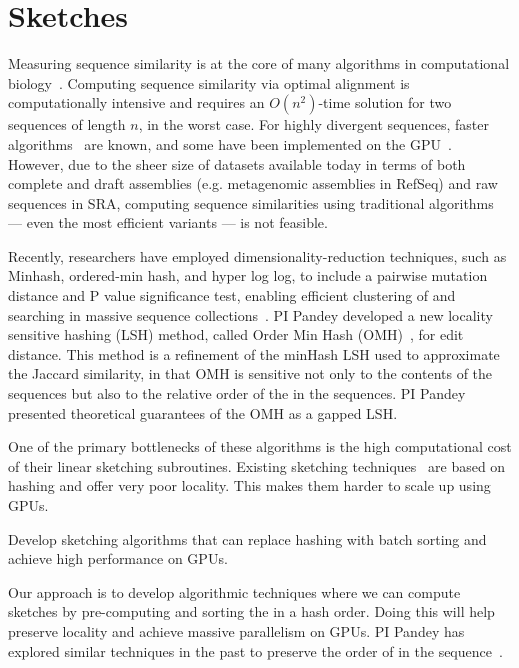 \section{Sketches}

Measuring sequence similarity is at the core of many algorithms in computational biology~\cite{Myers2000, Langmead2012,Li2010}. Computing sequence similarity via optimal alignment is computationally intensive and requires an $O(n^2)$-time solution for two sequences of length $n$, in the worst case.  For highly divergent sequences, faster algorithms~\cite{MarcoSola2023} are known, and some have been implemented on the GPU~\cite{AguadoPuig2023}. However, due to the sheer size of datasets available today in terms of both complete and draft assemblies (e.g. metagenomic assemblies in RefSeq) and raw sequences in SRA, computing sequence similarities using traditional algorithms --- even the most efficient variants --- is not feasible.

Recently, researchers have employed dimensionality-reduction techniques, such as Minhash, ordered-min hash, and hyper log log, to include a pairwise mutation distance and P value significance test, enabling  efficient clustering of and searching in massive sequence collections~\cite{Mitzenmacher2014,ondov2016mash,Marais2019,Baker2019}. PI Pandey developed a new locality sensitive hashing (LSH) method, called Order Min Hash (OMH)~\cite{Marais2019}, for  edit distance. This method is a refinement of the minHash LSH used to approximate the Jaccard similarity, in that OMH is sensitive not only to the \kmer contents of the sequences but also to the relative order of the \kmers in the sequences. PI Pandey presented theoretical guarantees of the OMH as a gapped LSH\@.

One of the primary bottlenecks of these algorithms is the high computational cost of their linear sketching subroutines. Existing sketching techniques~\cite{ondov2016mash,Marais2019} are based on hashing and offer very poor locality. This makes them harder to scale up using GPUs.

\begin{rproblem}
Develop sketching algorithms that can replace hashing with batch sorting and achieve high performance on GPUs.
\end{rproblem}

Our approach is to develop algorithmic techniques where we can compute sketches by pre-computing and sorting the \kmers in a hash order. Doing this will help preserve locality and achieve massive parallelism on GPUs. PI Pandey has explored similar techniques in the past to preserve the order of \kmers in the sequence~\cite{Marais2019}.

